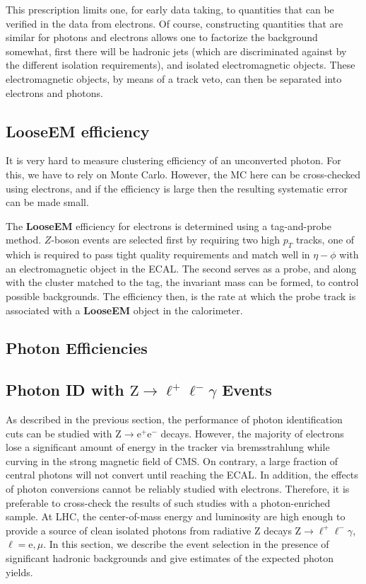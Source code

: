 \documentclass{cmspaper}
\begin{document}
This prescription limits one, for early data taking, to quantities that can be verified in the data from electrons.  Of course, constructing quantities that are similar for photons and electrons allows one to factorize the background somewhat, first there will be hadronic jets (which are discriminated against by the different isolation requirements), and isolated electromagnetic objects.  These electromagnetic objects, by means of a track veto, can then be separated into electrons and photons.

\subsection{LooseEM efficiency}\label{ssec:LooseEMEff}

It is very hard to measure clustering efficiency of an unconverted photon. For this, we have to rely on Monte Carlo.
However, the MC here can be cross-checked using electrons, and if the efficiency is large then the resulting systematic error can be made small. 

The {\bf LooseEM} efficiency for electrons is determined using a tag-and-probe method.  $Z$-boson events are selected first by requiring two high $p_T$ tracks, one of which is required to pass tight quality requirements and match well in $\eta-\phi$ with an electromagnetic object in the ECAL.  The second serves as a probe, and along with the cluster matched to the tag, the invariant mass can be formed, to control possible backgrounds.  The efficiency then, is the rate at which the probe track is associated with a {\bf LooseEM} object in the calorimeter.

\subsection{Photon Efficiencies}

\subsection{Photon ID with \boldmath $\mathrm{Z}\to \ell^+\ell^- \gamma$ Events}
As described in the previous section, the
performance of photon identification cuts  can be  studied with $\mathrm{Z} \to\mathrm{e}^+\mathrm{e}^-$
decays. However, the majority of electrons lose a significant amount of energy in the tracker via bremsstrahlung while curving 
in the strong magnetic field of CMS. On contrary, a large fraction of central photons will not convert until reaching
the ECAL. In addition, the effects of photon conversions cannot be reliably studied
with electrons. Therefore, it is preferable to cross-check the results of such studies with a photon-enriched sample.
At LHC, the center-of-mass energy and luminosity are high enough to provide a source of clean isolated photons
 from radiative Z decays  $\mathrm{Z}\to \ell^+\ell^- \gamma$, $\ell =\mathrm{e},\mu$. 
In this section, we describe the event selection in the presence of significant
hadronic backgrounds and give  estimates of the expected photon yields.
\end{document}
